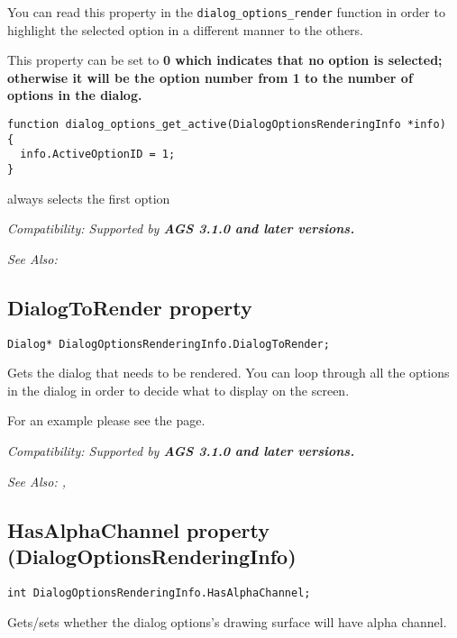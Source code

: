 You can read this property in the \verb$dialog_options_render$ function in order to highlight
the selected option in a different manner to the others.

This property can be set to \bf{0} which indicates that no option is selected; otherwise it
will be the option number from 1 to the number of options in the dialog.

\begin{verbatim}
function dialog_options_get_active(DialogOptionsRenderingInfo *info)
{
  info.ActiveOptionID = 1;
}
\end{verbatim}
always selects the first option

\it{Compatibility:} Supported by \bf{AGS 3.1.0} and later versions.

\it{See Also:} 


\subsection{DialogToRender property}\label{DialogOptionsRenderingInfo.DialogToRender}%

\begin{verbatim}
Dialog* DialogOptionsRenderingInfo.DialogToRender;
\end{verbatim}
Gets the dialog that needs to be rendered. You can loop through all the options in the dialog
in order to decide what to display on the screen.

For an example please see the  page.

\it{Compatibility:} Supported by \bf{AGS 3.1.0} and later versions.

\it{See Also:} ,

\subsection{HasAlphaChannel property (DialogOptionsRenderingInfo)}\label{DialogOptionsRenderingInfo.HasAlphaChannel}%

\begin{verbatim}
int DialogOptionsRenderingInfo.HasAlphaChannel;
\end{verbatim}
Gets/sets whether the dialog options's drawing surface will have alpha channel.

